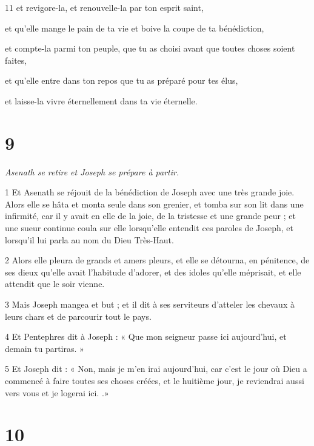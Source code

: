 \par 11 et revigore-la, et renouvelle-la par ton esprit saint,
\par et qu'elle mange le pain de ta vie et boive la coupe de ta bénédiction,
\par et compte-la parmi ton peuple, que tu as choisi avant que toutes choses soient faites,
\par et qu'elle entre dans ton repos que tu as préparé pour tes élus,
\par et laisse-la vivre éternellement dans ta vie éternelle.

\chapter{9}

\par \textit{Asenath se retire et Joseph se prépare à partir.}

\par 1 Et Asenath se réjouit de la bénédiction de Joseph avec une très grande joie. Alors elle se hâta et monta seule dans son grenier, et tomba sur son lit dans une infirmité, car il y avait en elle de la joie, de la tristesse et une grande peur ; et une sueur continue coula sur elle lorsqu'elle entendit ces paroles de Joseph, et lorsqu'il lui parla au nom du Dieu Très-Haut.

\par 2 Alors elle pleura de grands et amers pleurs, et elle se détourna, en pénitence, de ses dieux qu'elle avait l'habitude d'adorer, et des idoles qu'elle méprisait, et elle attendit que le soir vienne.

\par 3 Mais Joseph mangea et but ; et il dit à ses serviteurs d'atteler les chevaux à leurs chars et de parcourir tout le pays.

\par 4 Et Pentephres dit à Joseph : « Que mon seigneur passe ici aujourd'hui, et demain tu partiras. »

\par 5 Et Joseph dit : « Non, mais je m'en irai aujourd'hui, car c'est le jour où Dieu a commencé à faire toutes ses choses créées, et le huitième jour, je reviendrai aussi vers vous et je logerai ici. .»

\chapter{10}

